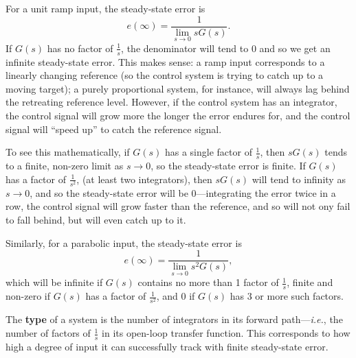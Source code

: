 \documentclass{article}
\begin{document}
For a unit ramp input, the steady-state error is
\[e(\infty) = \frac{1}{\lim\limits_{s\to 0}sG(s)}.\]
If $G(s)$ has no factor of $\frac{1}{s}$, the denominator will tend to 0 and so we get an infinite steady-state error. This makes sense: a ramp input corresponds to a linearly changing reference (so the control system is trying to catch up to a moving target); a purely proportional system, for instance, will always lag behind the retreating reference level. However, if the control system has an integrator, the control signal will grow more the longer the error endures for, and the control signal will ``speed up'' to catch the reference signal.

To see this mathematically, if $G(s)$ has a single factor of $\frac{1}{s}$, then $sG(s)$ tends to a finite, non-zero limit as $s\to 0$, so the steady-state error is finite. If $G(s)$ has a factor of $\frac{1}{s^2}$, (at least two integrators), then $sG(s)$ will tend to infinity as $s\to 0$, and so the steady-state error will be 0---integrating the error twice in a row, the control signal will grow faster than the reference, and so will not ony fail to fall behind, but will even catch up to it.\medskip


Similarly, for a parabolic input, the steady-state error is
\[e(\infty)=\frac{1}{\lim\limits_{s\to 0}s^2G(s)},\]
which will be infinite if $G(s)$ contains no more than 1 factor of $\frac{1}{s}$, finite and non-zero if $G(s)$ has a factor of $\frac{1}{s^2}$, and 0 if $G(s)$ has 3 or more such factors.\bigskip


The \textbf{type} of a system is the number of integrators in its forward path---\textit{i.e.}, the number of factors of $\frac{1}{s}$ in its open-loop transfer function. This corresponds to how high a degree of input it can successfully track with finite steady-state error.
\end{document}

